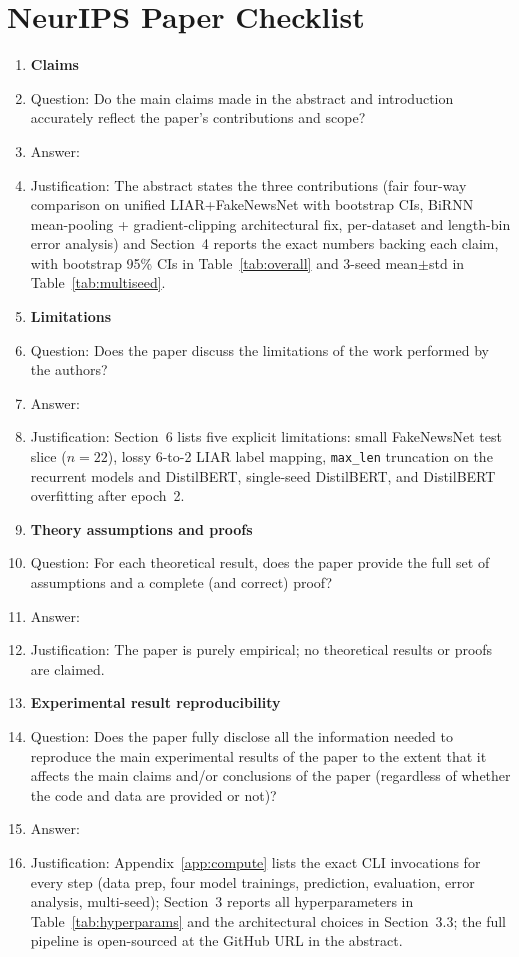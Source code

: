 \section*{NeurIPS Paper Checklist}

\begin{enumerate}

\item {\bf Claims}
    \item[] Question: Do the main claims made in the abstract and introduction accurately reflect the paper's contributions and scope?
    \item[] Answer: \answerYes{}
    \item[] Justification: The abstract states the three contributions (fair four-way comparison on unified LIAR+FakeNewsNet with bootstrap CIs, BiRNN mean-pooling + gradient-clipping architectural fix, per-dataset and length-bin error analysis) and Section~4 reports the exact numbers backing each claim, with bootstrap 95\% CIs in Table~\ref{tab:overall} and 3-seed mean$\pm$std in Table~\ref{tab:multiseed}.

\item {\bf Limitations}
    \item[] Question: Does the paper discuss the limitations of the work performed by the authors?
    \item[] Answer: \answerYes{}
    \item[] Justification: Section~6 lists five explicit limitations: small FakeNewsNet test slice ($n=22$), lossy 6-to-2 LIAR label mapping, \texttt{max\_len} truncation on the recurrent models and DistilBERT, single-seed DistilBERT, and DistilBERT overfitting after epoch~2.

\item {\bf Theory assumptions and proofs}
    \item[] Question: For each theoretical result, does the paper provide the full set of assumptions and a complete (and correct) proof?
    \item[] Answer: \answerNA{}
    \item[] Justification: The paper is purely empirical; no theoretical results or proofs are claimed.

\item {\bf Experimental result reproducibility}
    \item[] Question: Does the paper fully disclose all the information needed to reproduce the main experimental results of the paper to the extent that it affects the main claims and/or conclusions of the paper (regardless of whether the code and data are provided or not)?
    \item[] Answer: \answerYes{}
    \item[] Justification: Appendix~\ref{app:compute} lists the exact CLI invocations for every step (data prep, four model trainings, prediction, evaluation, error analysis, multi-seed); Section~3 reports all hyperparameters in Table~\ref{tab:hyperparams} and the architectural choices in Section~3.3; the full pipeline is open-sourced at the GitHub URL in the abstract.


\end{enumerate}
